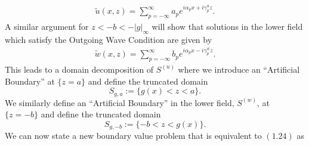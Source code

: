 \begin{align}
\tilde{u}(x,z)=\sum_{p=-\infty}^{\infty}a_pe^{i\alpha_px + i\gamma_p^u z}.   
\end{align}
A similar argument for $z < -b < -\left| g \right|_{\infty}$ will show that solutions in the lower field which satisfy the Outgoing Wave Condition are given by
\begin{align}
\tilde{w}(x,z)=\sum_{p=-\infty}^{\infty}b_pe^{i\alpha_px - i\gamma_p^w z}.   
\end{align}
This leads to a domain decomposition of $S^{(u)}$ where we introduce an ``Artificial Boundary'' at $\{z=a\}$ and define the truncated domain 
$$S_{g,a}:= \{g(x) < z < a\}.$$
We similarly define an ``Artificial Boundary'' in the lower field, $S^{(w)}$, at $\{z=-b\}$ and define the truncated domain 
$$S_{g,-b}:= \{-b < z < g(x)\}.$$
We can now state a new boundary value problem that is equivalent to $(1.24)$ as

